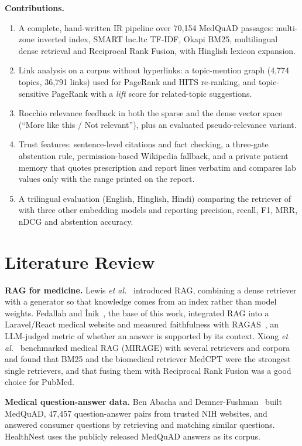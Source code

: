 \documentclass[conference]{IEEEtran}
\begin{document}
\textbf{Contributions.}
\begin{enumerate}
  \item A complete, hand-written IR pipeline over 70,154 MedQuAD passages: multi-zone inverted index, SMART lnc.ltc TF-IDF, Okapi BM25, multilingual dense retrieval and Reciprocal Rank Fusion, with Hinglish lexicon expansion.
  \item Link analysis on a corpus without hyperlinks: a topic-mention graph (4,774 topics, 36,791 links) used for PageRank and HITS re-ranking, and topic-sensitive PageRank with a \emph{lift} score for related-topic suggestions.
  \item Rocchio relevance feedback in both the sparse and the dense vector space (``More like this / Not relevant''), plus an evaluated pseudo-relevance variant.
  \item Trust features: sentence-level citations and fact checking, a three-gate abstention rule, permission-based Wikipedia fallback, and a private patient memory that quotes prescription and report lines verbatim and compares lab values only with the range printed on the report.
  \item A trilingual evaluation (English, Hinglish, Hindi) comparing the retriever of~\cite{fedallah2026} with three other embedding models and reporting precision, recall, F1, MRR, nDCG and abstention accuracy.
\end{enumerate}

\section{Literature Review}
\textbf{RAG for medicine.} Lewis \textit{et al.}~\cite{lewis2020} introduced RAG, combining a dense retriever with a generator so that knowledge comes from an index rather than model weights. Fedallah and \.{I}nik~\cite{fedallah2026}, the base of this work, integrated RAG into a Laravel/React medical website and measured faithfulness with RAGAS~\cite{es2024}, an LLM-judged metric of whether an answer is supported by its context. Xiong \textit{et al.}~\cite{xiong2024} benchmarked medical RAG (MIRAGE) with several retrievers and corpora and found that BM25 and the biomedical retriever MedCPT were the strongest single retrievers, and that fusing them with Reciprocal Rank Fusion was a good choice for PubMed.

\textbf{Medical question-answer data.} Ben Abacha and Demner-Fushman~\cite{abacha2019} built MedQuAD, 47,457 question-answer pairs from trusted NIH websites, and answered consumer questions by retrieving and matching similar questions. HealthNest uses the publicly released MedQuAD answers as its corpus.
\end{document}
